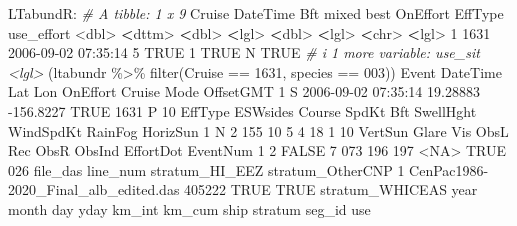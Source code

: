 \documentclass[
]{book}
\newenvironment{Shaded}{\begin{snugshade}}{\end{snugshade}}
\newcommand{\CommentTok}[1]{\textcolor[rgb]{0.56,0.35,0.01}{\textit{#1}}}
\newcommand{\ConstantTok}[1]{\textcolor[rgb]{0.00,0.00,0.00}{#1}}
\newcommand{\DecValTok}[1]{\textcolor[rgb]{0.00,0.00,0.81}{#1}}
\newcommand{\ErrorTok}[1]{\textcolor[rgb]{0.64,0.00,0.00}{\textbf{#1}}}
\newcommand{\FloatTok}[1]{\textcolor[rgb]{0.00,0.00,0.81}{#1}}
\newcommand{\FunctionTok}[1]{\textcolor[rgb]{0.00,0.00,0.00}{#1}}
\newcommand{\NormalTok}[1]{#1}
\newcommand{\SpecialCharTok}[1]{\textcolor[rgb]{0.00,0.00,0.00}{#1}}
\newcommand{\StringTok}[1]{\textcolor[rgb]{0.31,0.60,0.02}{#1}}
\begin{document}
\begin{Shaded}
\begin{Highlighting}[]
\NormalTok{LTabundR}\SpecialCharTok{:}
\CommentTok{\# A tibble: 1 x 9}
\NormalTok{  Cruise DateTime              Bft mixed  best OnEffort EffType use\_effort}
   \SpecialCharTok{\textless{}}\NormalTok{dbl}\SpecialCharTok{\textgreater{}} \ErrorTok{\textless{}}\NormalTok{dttm}\SpecialCharTok{\textgreater{}}              \ErrorTok{\textless{}}\NormalTok{dbl}\SpecialCharTok{\textgreater{}} \ErrorTok{\textless{}}\NormalTok{lgl}\SpecialCharTok{\textgreater{}} \ErrorTok{\textless{}}\NormalTok{dbl}\SpecialCharTok{\textgreater{}} \ErrorTok{\textless{}}\NormalTok{lgl}\SpecialCharTok{\textgreater{}}    \ErrorTok{\textless{}}\NormalTok{chr}\SpecialCharTok{\textgreater{}}   \ErrorTok{\textless{}}\NormalTok{lgl}\SpecialCharTok{\textgreater{}}     
\DecValTok{1}   \DecValTok{1631} \DecValTok{2006{-}09{-}02} \DecValTok{07}\SpecialCharTok{:}\DecValTok{35}\SpecialCharTok{:}\DecValTok{14}     \DecValTok{5} \ConstantTok{TRUE}      \DecValTok{1} \ConstantTok{TRUE}\NormalTok{     N       }\ConstantTok{TRUE}      
\CommentTok{\# i 1 more variable: use\_sit \textless{}lgl\textgreater{}}
\NormalTok{(ltabundr }\SpecialCharTok{\%\textgreater{}\%} \FunctionTok{filter}\NormalTok{(Cruise }\SpecialCharTok{==} \DecValTok{1631}\NormalTok{, species }\SpecialCharTok{==} \StringTok{\textquotesingle{}003\textquotesingle{}}\NormalTok{))}
\NormalTok{  Event            DateTime      Lat       Lon OnEffort Cruise Mode OffsetGMT}
\DecValTok{1}\NormalTok{     S }\DecValTok{2006{-}09{-}02} \DecValTok{07}\SpecialCharTok{:}\DecValTok{35}\SpecialCharTok{:}\DecValTok{14} \FloatTok{19.28883} \SpecialCharTok{{-}}\FloatTok{156.8227}     \ConstantTok{TRUE}   \DecValTok{1631}\NormalTok{    P        }\DecValTok{10}
\NormalTok{  EffType ESWsides Course SpdKt Bft SwellHght WindSpdKt RainFog HorizSun}
\DecValTok{1}\NormalTok{       N        }\DecValTok{2}    \DecValTok{155}    \DecValTok{10}   \DecValTok{5}         \DecValTok{4}        \DecValTok{18}       \DecValTok{1}       \DecValTok{10}
\NormalTok{  VertSun Glare Vis ObsL Rec ObsR ObsInd EffortDot EventNum}
\DecValTok{1}       \DecValTok{2} \ConstantTok{FALSE}   \DecValTok{7}  \DecValTok{073} \DecValTok{196}  \DecValTok{197}   \SpecialCharTok{\textless{}}\ConstantTok{NA}\SpecialCharTok{\textgreater{}}      \ConstantTok{TRUE}      \DecValTok{026}
\NormalTok{                              file\_das line\_num stratum\_HI\_EEZ stratum\_OtherCNP}
\DecValTok{1}\NormalTok{ CenPac1986}\SpecialCharTok{{-}}\NormalTok{2020\_Final\_alb\_edited.das   }\DecValTok{405222}           \ConstantTok{TRUE}             \ConstantTok{TRUE}
\NormalTok{  stratum\_WHICEAS year month day yday km\_int   km\_cum ship stratum seg\_id  use}

\end{Highlighting}
\end{Shaded}
\end{document}
